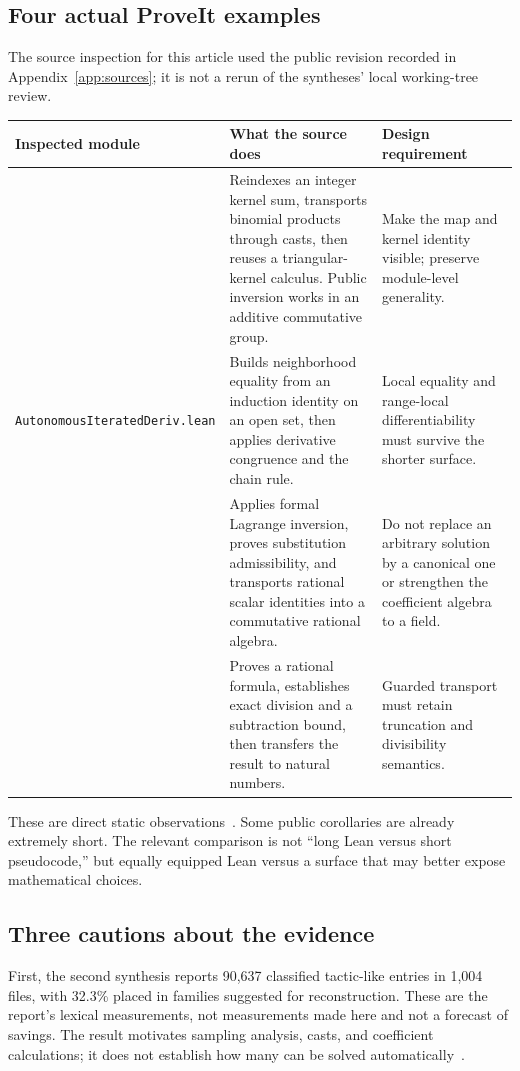 \documentclass[11pt,a4paper]{article}
\theoremstyle{remark}\newtheorem{example}[proposition]{Example}
\begin{document}
\subsection{Four actual ProveIt examples}
The source inspection for this article used the public revision recorded in Appendix~\ref{app:sources}; it is not a rerun of the syntheses' local working-tree review.
\begin{longtable}{@{}P{.27\textwidth}P{.34\textwidth}P{.31\textwidth}@{}}
\toprule
Inspected module & What the source does & Design requirement \\
\midrule\endhead
{} & Reindexes an integer kernel sum, transports binomial products through casts, then reuses a triangular-kernel calculus. Public inversion works in an additive commutative group. & Make the map and kernel identity visible; preserve module-level generality.\\
\texttt{Autonomous\allowbreak{}Iterated\allowbreak{}Deriv.lean} & Builds neighborhood equality from an induction identity on an open set, then applies derivative congruence and the chain rule. & Local equality and range-local differentiability must survive the shorter surface.\\
 & Applies formal Lagrange inversion, proves substitution admissibility, and transports rational scalar identities into a commutative rational algebra. & Do not replace an arbitrary solution by a canonical one or strengthen the coefficient algebra to a field.\\
 & Proves a rational formula, establishes exact division and a subtraction bound, then transfers the result to natural numbers. & Guarded transport must retain truncation and divisibility semantics.\\
\bottomrule
\end{longtable}
These are direct static observations~\cite{binomial,ode,abel,sqrt}. Some public corollaries are already extremely short. The relevant comparison is not ``long Lean versus short pseudocode,'' but equally equipped Lean versus a surface that may better expose mathematical choices.

\subsection{Three cautions about the evidence}
First, the second synthesis reports 90,637 classified tactic-like entries in 1,004 files, with 32.3\% placed in families suggested for reconstruction. These are the report's lexical measurements, not measurements made here and not a forecast of savings. The result motivates sampling analysis, casts, and coefficient calculations; it does not establish how many can be solved automatically~\cite[section 3]{blueprints}.
\end{document}
